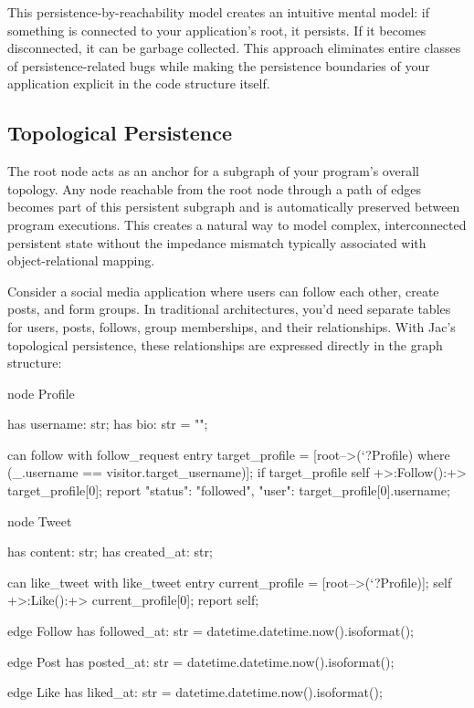 This persistence-by-reachability model creates an intuitive mental model: if something is connected to your application's root, it persists. If it becomes disconnected, it can be garbage collected. This approach eliminates entire classes of persistence-related bugs while making the persistence boundaries of your application explicit in the code structure itself.

\subsection{Topological Persistence}

The root node acts as an anchor for a subgraph of your program's overall topology. Any node reachable from the root node through a path of edges becomes part of this persistent subgraph and is automatically preserved between program executions. This creates a natural way to model complex, interconnected persistent state without the impedance mismatch typically associated with object-relational mapping.

Consider a social media application where users can follow each other, create posts, and form groups. In traditional architectures, you'd need separate tables for users, posts, follows, group memberships, and their relationships. With Jac's topological persistence, these relationships are expressed directly in the graph structure:

\begin{jacblock}
node Profile {
    has username: str;
    has bio: str = "";

    can follow with follow_request entry {
        target_profile = [root-->(`?Profile) where (_.username == visitor.target_username)];
        if target_profile {
            self +>:Follow():+> target_profile[0];
            report {"status": "followed", "user": target_profile[0].username};
        }
    }
}

node Tweet {
    has content: str;
    has created_at: str;

    can like_tweet with like_tweet entry {
        current_profile = [root-->(`?Profile)];
        self +>:Like():+> current_profile[0];
        report self;
    }
}

edge Follow {
    has followed_at: str = datetime.datetime.now().isoformat();
}

edge Post {
    has posted_at: str = datetime.datetime.now().isoformat();
}

edge Like {
    has liked_at: str = datetime.datetime.now().isoformat();
}
\end{jacblock}

